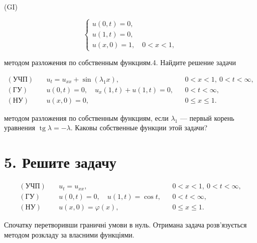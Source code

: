 \documentclass[
  ukrainian,
]{article}
\begin{document}
(GI)

\[
\begin{cases} u(0, t) = 0, \\ u(1, t) = 0, \\ u(x, 0) = 1, \quad 0 < x < 1, \end{cases}
\]

методом разложения по собственным функциям.4. Найдите решение задачи

\[
\begin{aligned}
(\text{УЧП})\quad & u_t = u_{xx} + \sin(\lambda_1 x), && 0 < x < 1,\ 0 < t < \infty, \\
(\text{ГУ})\quad & u(0,t) = 0,\quad u_x(1,t) + u(1,t) = 0, && 0 < t < \infty, \\
(\text{НУ})\quad & u(x,0) = 0, && 0 \leqslant x \leqslant 1.
\end{aligned}
\]

методом разложения по собственным функциям, если \(\lambda_1\) ---
первый корень уравнения \(\operatorname{tg}\lambda = -\lambda\). Каковы
собственные функции этой задачи?

\section{5. Решите
задачу}\label{ux440ux435ux448ux438ux442ux435-ux437ux430ux434ux430ux447ux443}

\[
\begin{aligned}
(\text{УЧП})\quad & u_t = u_{xx}, && 0 < x < 1,\ 0 < t < \infty, \\
(\text{ГУ})\quad & u(0,t) = 0,\quad u(1,t) = \cos t, && 0 < t < \infty, \\
(\text{НУ})\quad & u(x,0) = \varphi(x), && 0 \leqslant x \leqslant 1.
\end{aligned}
\]

Спочатку перетворивши граничні умови в нуль. Отримана задача
розв'язується методом розкладу за власними функціями.
\end{document}
